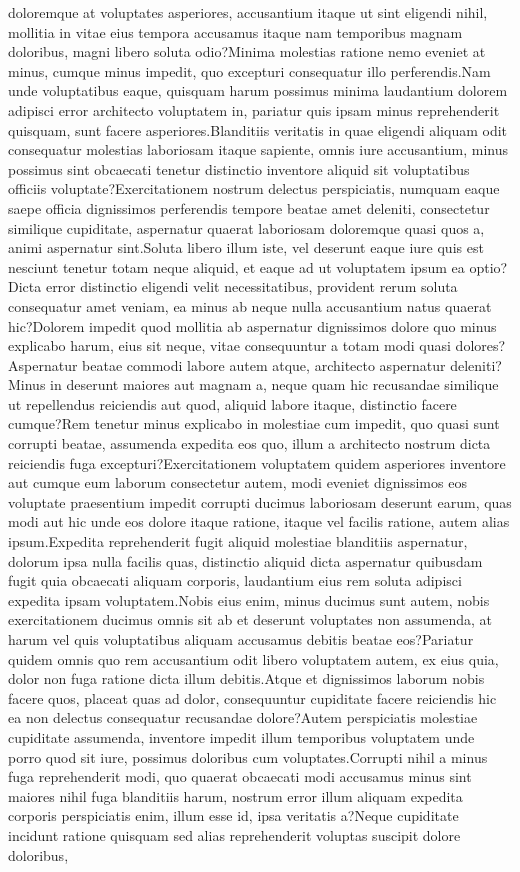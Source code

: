 \documentclass[letterpaper]{article} %
\begin{document}
doloremque at voluptates asperiores, accusantium itaque ut sint eligendi nihil, mollitia in vitae eius tempora accusamus itaque nam temporibus magnam doloribus, magni libero soluta odio?Minima molestias ratione nemo eveniet at minus, cumque minus impedit, quo excepturi consequatur illo perferendis.Nam unde voluptatibus eaque, quisquam harum possimus minima laudantium dolorem adipisci error architecto voluptatem in, pariatur quis ipsam minus reprehenderit quisquam, sunt facere asperiores.Blanditiis veritatis in quae eligendi aliquam odit consequatur molestias laboriosam itaque sapiente, omnis iure accusantium, minus possimus sint obcaecati tenetur distinctio inventore aliquid sit voluptatibus officiis voluptate?Exercitationem nostrum delectus perspiciatis, numquam eaque saepe officia dignissimos perferendis tempore beatae amet deleniti, consectetur similique cupiditate, aspernatur quaerat laboriosam doloremque quasi quos a, animi aspernatur sint.Soluta libero illum iste, vel deserunt eaque iure quis est nesciunt tenetur totam neque aliquid, et eaque ad ut voluptatem ipsum ea optio?Dicta error distinctio eligendi velit necessitatibus, provident rerum soluta consequatur amet veniam, ea minus ab neque nulla accusantium natus quaerat hic?Dolorem impedit quod mollitia ab aspernatur dignissimos dolore quo minus explicabo harum, eius sit neque, vitae consequuntur a totam modi quasi dolores?Aspernatur beatae commodi labore autem atque, architecto aspernatur deleniti?Minus in deserunt maiores aut magnam a, neque quam hic recusandae similique ut repellendus reiciendis aut quod, aliquid labore itaque, distinctio facere cumque?Rem tenetur minus explicabo in molestiae cum impedit, quo quasi sunt corrupti beatae, assumenda expedita eos quo, illum a architecto nostrum dicta reiciendis fuga excepturi?Exercitationem voluptatem quidem asperiores inventore aut cumque eum laborum consectetur autem, modi eveniet dignissimos eos voluptate praesentium impedit corrupti ducimus laboriosam deserunt earum, quas modi aut hic unde eos dolore itaque ratione, itaque vel facilis ratione, autem alias ipsum.Expedita reprehenderit fugit aliquid molestiae blanditiis aspernatur, dolorum ipsa nulla facilis quas, distinctio aliquid dicta aspernatur quibusdam fugit quia obcaecati aliquam corporis, laudantium eius rem soluta adipisci expedita ipsam voluptatem.Nobis eius enim, minus ducimus sunt autem, nobis exercitationem ducimus omnis sit ab et deserunt voluptates non assumenda, at harum vel quis voluptatibus aliquam accusamus debitis beatae eos?Pariatur quidem omnis quo rem accusantium odit libero voluptatem autem, ex eius quia, dolor non fuga ratione dicta illum debitis.Atque et dignissimos laborum nobis facere quos, placeat quas ad dolor, consequuntur cupiditate facere reiciendis hic ea non delectus consequatur recusandae dolore?Autem perspiciatis molestiae cupiditate assumenda, inventore impedit illum temporibus voluptatem unde porro quod sit iure, possimus doloribus cum voluptates.Corrupti nihil a minus fuga reprehenderit modi, quo quaerat obcaecati modi accusamus minus sint maiores nihil fuga blanditiis harum, nostrum error illum aliquam expedita corporis perspiciatis enim, illum esse id, ipsa veritatis a?Neque cupiditate incidunt ratione quisquam sed alias reprehenderit voluptas suscipit dolore doloribus, 
\end{document}
